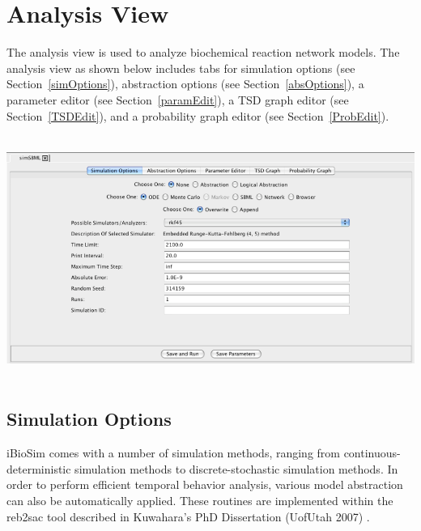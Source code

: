 \documentclass[titlepage,11pt]{article}
\begin{document}
\clearpage

\section{\label{Analysis}Analysis View}

\noindent
The analysis view is used to analyze biochemical reaction
network models. The analysis view as shown below includes tabs for 
simulation options (see Section~\ref{simOptions}), 
abstraction options (see Section~\ref{absOptions}), 
a parameter editor (see Section~\ref{paramEdit}), 
a TSD graph editor (see Section~\ref{TSDEdit}), and a 
probability graph editor (see Section~\ref{ProbEdit}).
\begin{center}
\includegraphics[height=80mm]{screenshots/analysisView}
\end{center}

\subsection{\label{simOptions}Simulation Options}

\noindent
iBioSim comes with a number of simulation methods, ranging
from continuous-deterministic simulation methods to
discrete-stochastic simulation methods. In order to perform
efficient temporal behavior analysis, various model abstraction
can also be automatically applied.  These routines are implemented
within the reb2sac tool described in 
Kuwahara's PhD Dissertation (UofUtah 2007)
. 
\end{document}
